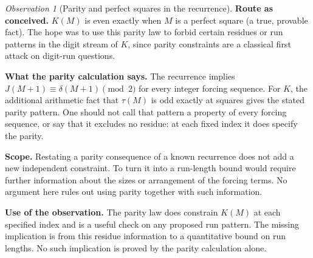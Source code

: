 \documentclass[11pt]{article}
\theoremstyle{plain}
\theoremstyle{definition}
\theoremstyle{remark}
\newtheorem{obs}[thm]{Observation}
\begin{document}
\begin{obs}[Parity and perfect squares in the recurrence]
\label{obs:parity-squares}
\textbf{Route as conceived.} $K(M)$ is even exactly when $M$ is a perfect square (a true,
provable fact). The hope was to use this parity law to forbid certain residues or run patterns in
the digit stream of $K$, since parity constraints are a classical first attack on digit-run
questions.

\textbf{What the parity calculation says.} The recurrence implies
$J(M+1)\equiv\delta(M+1)\pmod2$ for every integer forcing sequence.
For $K$, the additional arithmetic fact that $\tau(M)$ is odd exactly
at squares gives the stated parity pattern.  One should not call that
pattern a property of every forcing sequence, or say that it excludes
no residue: at each fixed index it does specify the parity.

\textbf{Scope.} Restating a parity consequence of a known recurrence
does not add a new independent constraint.  To turn it into a
run-length bound would require further information about the sizes or
arrangement of the forcing terms.  No argument here rules out using
parity together with such information.

\textbf{Use of the observation.} The parity law does constrain
$K(M)$ at each specified index and is a useful check on any proposed
run pattern.  The missing implication is from this residue information
to a quantitative bound on run lengths.  No such implication is
proved by the parity calculation alone.
\end{obs}
\end{document}

